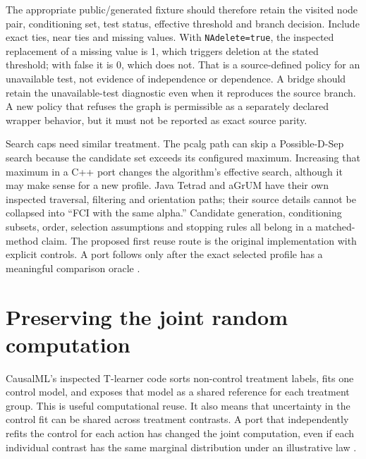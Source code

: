 The appropriate public/generated fixture should therefore retain the visited
node pair, conditioning set, test status, effective threshold and branch
decision. Include exact ties, near ties and missing values. With
\texttt{NAdelete=true}, the inspected replacement of a missing value is 1,
which triggers deletion at the stated threshold; with false it is 0, which
does not. That is a source-defined policy for an unavailable test, not evidence
of independence or dependence. A bridge should retain the unavailable-test
diagnostic even when it reproduces the source branch. A new policy that refuses
the graph is permissible as a separately declared wrapper behavior, but it
must not be reported as exact source parity.

Search caps need similar treatment. The pcalg path can skip a Possible-D-Sep
search because the candidate set exceeds its configured maximum. Increasing
that maximum in a C++ port changes the algorithm's effective search, although
it may make sense for a new profile. Java Tetrad and aGrUM have their own
inspected traversal, filtering and orientation paths; their source details
cannot be collapsed into ``FCI with the same alpha.'' Candidate generation,
conditioning subsets, order, selection assumptions and stopping rules all
belong in a matched-method claim. The proposed first reuse route is the
original implementation with explicit controls. A port follows only after
the exact selected profile has a meaningful comparison oracle
\citep{exec13_latentr_primary,exec14_java_latent_sources,exec14_native_agrum}.

\section{Preserving the joint random computation}

CausalML's inspected T-learner code sorts non-control treatment labels, fits
one control model, and exposes that model as a shared reference for each
treatment group. This is useful computational reuse. It also means that
uncertainty in the control fit can be shared across treatment contrasts.
A port that independently refits the control for each action has changed
the joint computation, even if each individual contrast has the same marginal
distribution under an illustrative law \citep{exec14_causalml_primary}.

